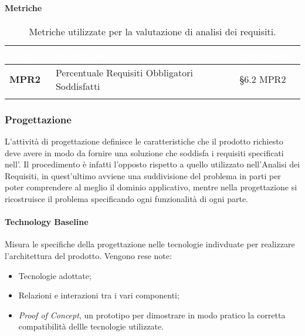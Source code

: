 \paragraph{Metriche}
\setlength{\freewidth}{\dimexpr\textwidth-0\tabcolsep}
\renewcommand{\arraystretch}{1.5}
\setlength{\aboverulesep}{0pt}
\setlength{\belowrulesep}{0pt}
\begin{longtable}{L{.22\freewidth} L{.4\freewidth} L{.2\freewidth}}
	\toprule
	\textcolor{white}{\textbf{Metrica}}&
	\textcolor{white}{\textbf{Descrizione}}&	
	\textcolor{white}{\textbf{Riferimento}}\\	
	\toprule
	\endhead
	
	\textbf{MPR2} & Percentuale Requisiti Obbligatori Soddisfatti & \S 6.2 MPR2 \\
	
	\bottomrule
	\caption*{Metriche utilizzate per la valutazione di analisi dei requisiti.}
\end{longtable}

\subsubsection{Progettazione} 
L'attività di progettazione definisce le caratteristiche che il prodotto richiesto deve avere in modo da fornire una soluzione che soddisfa i requisiti specificati nell'\AdR{}.
Il procedimento è infatti l'opposto rispetto a quello utilizzato nell'Analisi dei Requisiti, in quest'ultimo avviene una suddivisione del problema in parti
per poter comprendere al meglio il dominio applicativo, mentre nella progettazione si ricostruisce il problema specificando ogni funzionalità di ogni parte.

\paragraph{Technology Baseline}
Misura le specifiche della progettazione nelle tecnologie indivduate per realizzare l'architettura del prodotto. Vengono rese note:
\begin{itemize}
	\item Tecnologie adottate;
	\item Relazioni e interazioni tra i vari componenti;
	\item {\textit{Proof of Concept}}, un prototipo per dimostrare in modo pratico la corretta compatibilità  dellle tecnologie utilizzate.
\end{itemize}

